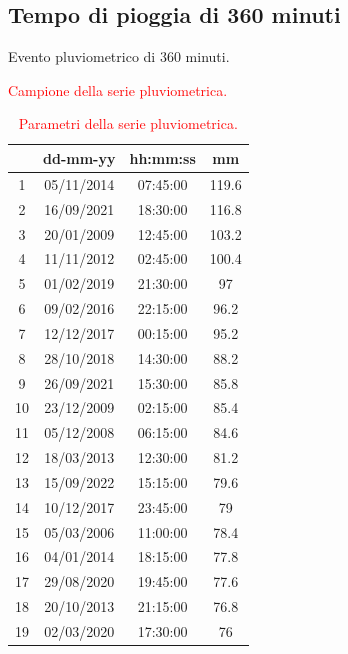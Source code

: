 \subsection{Tempo di pioggia di 360 minuti}

\begin{table}[H]
    \caption*{Evento pluviometrico di 360 minuti.}
    \begin{minipage}{.5\linewidth}
      \caption{\textcolor{red}{Campione della serie pluviometrica.}}
      \centering
        \begin{tabular}{cccc}
            \toprule
            & dd-mm-yy   & hh:mm:ss & mm  \\
         \midrule
         1  & 05/11/2014 & 07:45:00 & 119.6 \\
         2  & 16/09/2021 & 18:30:00 & 116.8 \\
         3  & 20/01/2009 & 12:45:00 & 103.2 \\
         4  & 11/11/2012 & 02:45:00 & 100.4 \\
         5  & 01/02/2019 & 21:30:00 & 97    \\
         6  & 09/02/2016 & 22:15:00 & 96.2  \\
         7  & 12/12/2017 & 00:15:00 & 95.2  \\
         8  & 28/10/2018 & 14:30:00 & 88.2  \\
         9  & 26/09/2021 & 15:30:00 & 85.8  \\
         10 & 23/12/2009 & 02:15:00 & 85.4  \\
         11 & 05/12/2008 & 06:15:00 & 84.6  \\
         12 & 18/03/2013 & 12:30:00 & 81.2  \\
         13 & 15/09/2022 & 15:15:00 & 79.6  \\
         14 & 10/12/2017 & 23:45:00 & 79    \\
         15 & 05/03/2006 & 11:00:00 & 78.4  \\
         16 & 04/01/2014 & 18:15:00 & 77.8  \\
         17 & 29/08/2020 & 19:45:00 & 77.6  \\
         18 & 20/10/2013 & 21:15:00 & 76.8  \\
         19 & 02/03/2020 & 17:30:00 & 76    \\
         \bottomrule
        \end{tabular}
    \end{minipage}%
    \begin{minipage}{.5\linewidth}
      \centering
        \caption{\textcolor{red}{Parametri della serie pluviometrica.}}

\end{minipage}
\end{table}
